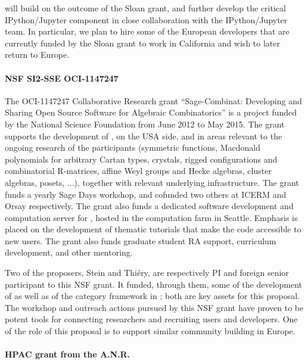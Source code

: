 \TheProject will build on the outcome of the Sloan grant, and further
develop the critical IPython/Jupyter component in close collaboration
with the IPython/Jupyter team. In particular, we plan to hire some of
the European developers that are currently funded by the Sloan grant
to work in California and wish to later return to Europe.

\paragraph{NSF SI2-SSE OCI-1147247}


The OCI-1147247 Collaborative Research grant ``Sage-Combinat:
Developing and Sharing Open Source Software for Algebraic
Combinatorics'' is a project funded by the National Science Foundation
from June 2012 to May 2015. The grant supports the development of
\SageCombinat, on the USA side, and in areas relevant to the ongoing
research of the participants (symmetric functions, Macdonald
polynomials for arbitrary Cartan types, crystals, rigged
configurations and combinatorial R-matrices, affine Weyl groups and
Hecke algebras, cluster algebras, posets, ...), together with relevant
underlying infrastructure. The grant funds a yearly Sage Days
workshop, and cofunded two others at ICERM and Orsay respectively. The
grant also funds a dedicated software development and computation
server for \SageCombinat, hosted in the \Sage computation farm in
Seattle. Emphasis is placed on the development of thematic tutorials
that make the code accessible to new users. The grant also funds
graduate student RA support, curriculum development, and other
mentoring.

Two of the proposers, Stein and Thiéry, are respectively PI and
foreign senior participant to this NSF grant. It funded, through them,
some of the development of \SMC as well as of the category framework
in \Sage; both are key assets for this proposal. The workshop and
outreach actions pursued by this NSF grant have proven to be potent
tools for connecting researchers and recruiting users and
developers. One of the role of this proposal is to support similar
community building in Europe.

\paragraph{HPAC grant from the A.N.R.}

